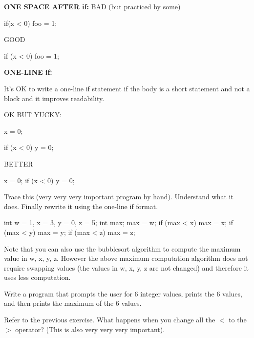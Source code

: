\newpage{}

\textbf{ONE SPACE AFTER if:}
BAD (but practiced by some)
\begin{console}
if(x < 0)
     foo = 1;  
\end{console}

GOOD
\begin{console}
if (x < 0)
   foo = 1;  
\end{console}

\textbf{ONE-LINE if:}

It's OK to write a one-line if statement if the body is
a short statement and not a block and it improves readability.

OK BUT YUCKY:
\begin{console}
x = 0;

if (x < 0)
    y = 0; 
\end{console}

BETTER
\begin{console}
x = 0;
if (x < 0) y = 0; 
\end{console}

\newpage{}

Trace this (very very very important program by hand). Understand what
it does. Finally rewrite it using the one-line if format.\\
\begin{console}
int w = 1, x = 3, y = 0, z = 5;
int max;
max = w;
if (max < x)
   max = x;
if (max < y)
   max = y;
if (max < z)
   max = z; 
\end{console}

Note that you can also use the bubblesort algorithm to compute the
maximum value in w, x, y, z. However the above maximum computation
algorithm does not require swapping values (the values in w, x, y, z are
not changed) and therefore it uses less computation.

\begin{ex}
Write a program that prompts the user for 6 integer
values, prints the 6 values, and then prints the maximum of the 6
values.
\end{ex}
\begin{ex} Refer to the previous exercise. What happens when you
change all the $<$ to the $>$ operator? (This is also very very very important).
\end{ex}

\newpage{}

